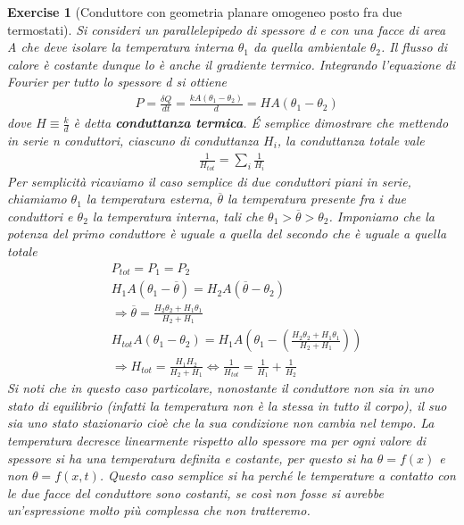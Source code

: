 \documentclass[10pt,a4paper]{article}
\newtheorem{exercise}{Exercise}
\begin{document}
\begin{exercise}[Conduttore con geometria planare omogeneo posto fra due termostati]
	Si consideri un parallelepipedo di spessore d e con una facce di area A che deve isolare la temperatura interna $\theta_1$ da quella ambientale $\theta_2$. Il flusso di calore è costante dunque lo è anche il gradiente termico. Integrando l'equazione di Fourier per tutto lo spessore d si ottiene 
	\begin{align*}
		&P = \frac{\delta Q}{dt} = \frac{k A (\theta_1 - \theta_2)}{d}= H A (\theta_1 - \theta_2)
	\end{align*}
	dove \(H\equiv \frac{k}{d}\) è detta \textbf{conduttanza termica}. \'{E} semplice dimostrare che mettendo in serie n conduttori, ciascuno di conduttanza $H_i$, la conduttanza totale vale
	\begin{align*}
		\frac{1}{H_{tot}} = \sum_i \frac{1}{H_i}
	\end{align*}
Per semplicità ricaviamo il caso semplice di due conduttori piani in serie, chiamiamo $\theta_1$ la temperatura esterna, $\overline{\theta}$ la temperatura presente fra i due conduttori e $\theta_2$ la temperatura interna, tali che \(\theta_1>\overline{\theta}>\theta_2\). Imponiamo che la potenza del primo conduttore è uguale a quella del secondo che è uguale a quella totale
	\begin{align*}
		&P_{tot} = P_1 = P_2\\
		&H_1 A (\theta_1 - \overline{\theta}) = H_2 A (\overline{\theta}-\theta_2)\\
		&\Rightarrow \overline{\theta} = \frac{H_2\theta_2 + H_1\theta_1}{H_2 + H_1}\\
		&H_{tot} A (\theta_1 - \theta_2) = H_1 A \left(\theta_1 - \left(\frac{H_2\theta_2 + H_1\theta_1}{H_2 + H_1}\right)\right)\\
		&\Rightarrow H_{tot} = \frac{H_1 H_2}{H_2 + H_1} \Leftrightarrow \frac{1}{H_{tot}} = \frac{1}{H_1}+\frac{1}{H_2}
	\end{align*}
	Si noti che in questo caso particolare, nonostante il conduttore non sia in uno stato di equilibrio (infatti la temperatura non è la stessa in tutto il corpo), il suo sia uno stato stazionario cioè che la sua condizione non cambia nel tempo. La temperatura decresce linearmente rispetto allo spessore ma per ogni valore di spessore si ha una temperatura definita e costante, per questo si ha $\theta = f(x)$ e non $\theta= f(x, t)$. Questo caso semplice si ha perché le temperature a contatto con le due facce del conduttore sono costanti, se così non fosse si avrebbe un'espressione molto più complessa che non tratteremo. 
\end{exercise}
\end{document}
